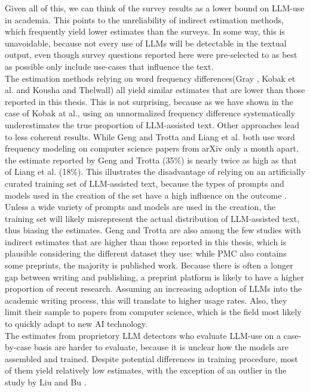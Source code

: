 Given all of this, we can think of the survey results as a lower bound on LLM-use in academia. 
This points to the unreliability of indirect estimation methods, which frequently yield lower estimates than the surveys. 
In some way, this is unavoidable, because not every use of LLMs will be detectable in the textual output, even though survey questions reported here were pre-selected to as best as possible only include use-cases that influence the text.
\\
The estimation methods relying on word frequency differences(Gray \cite{Gray2025,Gray2026}, Kobak et al. \cite{Kobak2025} and Kousha and Thelwall\cite{Kousha2025}) all yield similar estimates that are lower than those reported in this thesis.
This is not surprising, because as we have shown in the case of Kobak at al., using an unnormalized frequency difference systematically underestimates the true proportion of LLM-assisted text.
Other approaches lead to less coherent results.
While Geng and Trotta \cite{Geng2024} and Liang et al. \cite{Liang2024_paper} both use word frequency modeling on computer science papers from arXiv only a month apart, the estimate reported by Geng and Trotta (35\%) is nearly twice as high as that of Liang et al. (18\%).
This illustrates the disadvantage of relying on an artificially curated training set of LLM-assisted text, because the types of prompts and models used in the creation of the set have a high influence on the outcome \cite{Dou2024}.
Unless a wide variety of prompts and models are used in the creation, the training set will likely misrepresent the actual distribution of LLM-assisted text, thus biasing the estimates.
Geng and Trotta are also among the few studies with indirect estimates that are higher than those reported in this thesis, which is plausible considering the different dataset they use: while PMC also contains some preprints, the majority is published work. 
Because there is often a longer gap between writing and publishing, a preprint platform is likely to have a higher proportion of recent research. Assuming an increasing adoption of LLMs into the academic writing process, this will translate to higher usage rates.
Also, they limit their sample to papers from computer science, which is the field most likely to quickly adapt to new AI technology. 
\\
The estimates from proprietory LLM detectors who evaluate LLM-use on a case-by-case basis are harder to evaluate, because it is unclear how the models are assembled and trained.
Despite potential differences in training procedure, most of them yield relatively low estimates, with the exception of an outlier in the study by Liu and Bu \cite{Liu2024_profiles}.
